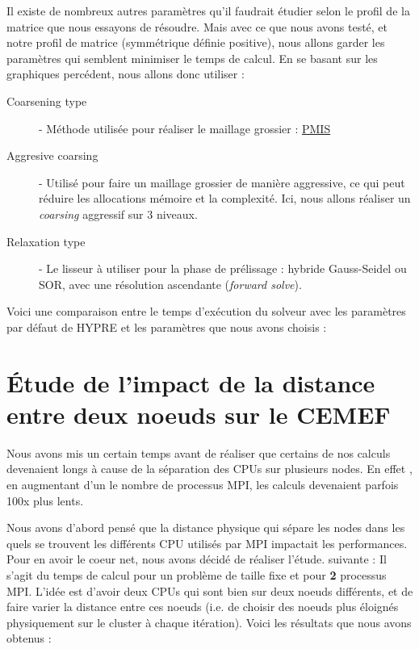 \documentclass[10pt,twocolumn,letterpaper]{article}
\begin{document}
Il existe de nombreux autres paramètres qu'il faudrait étudier selon le profil
de la matrice que nous essayons de résoudre. Mais avec ce que nous avons testé,
et notre profil de matrice (symmétrique définie positive), nous allons garder
les paramètres qui semblent minimiser le temps de calcul. En se basant sur les
graphiques percédent, nous allons donc utiliser :

\begin{description}
  \item[Coarsening type] - Méthode utilisée pour réaliser le maillage grossier :
\href{https://hypre.readthedocs.io/en/latest/ch-references.html#dfny2008}{PMIS}
  \item[Aggresive coarsing] - Utilisé pour faire un maillage grossier de manière
aggressive, ce qui peut réduire les allocations mémoire et la complexité. Ici, 
nous allons réaliser un \textit{coarsing} aggressif sur 3 niveaux. 
  \item[Relaxation type] - Le lisseur à utiliser pour la phase de prélissage :
hybride Gauss-Seidel ou SOR, avec une résolution ascendante (\textit{forward
solve}).
\end{description}


Voici une comparaison entre le temps d'exécution du solveur avec les  paramètres
par défaut de HYPRE et les paramètres que nous avons choisis :




\section{Étude de l'impact de la distance entre deux noeuds sur le CEMEF}

Nous avons mis un certain temps avant de réaliser que certains de nos calculs
devenaient longs à cause de la séparation des CPUs sur plusieurs nodes. En effet
, en augmentant d'un le nombre de processus MPI, les calculs devenaient parfois
100x plus lents.

Nous avons d'abord pensé que la distance physique qui sépare les nodes dans
les quels se trouvent les différents CPU utilisés par MPI impactait les
performances. Pour en avoir le coeur net, nous avons décidé de réaliser l'étude.
suivante :
Il s'agit du temps de calcul pour un problème de taille fixe et pour \textbf{2}
processus MPI. L'idée est d'avoir deux CPUs qui sont bien sur deux noeuds
différents, et de faire varier la distance entre ces noeuds
(i.e. de choisir des noeuds plus éloignés physiquement sur le cluster à chaque
itération). Voici les résultats que nous avons obtenus :
\end{document}
